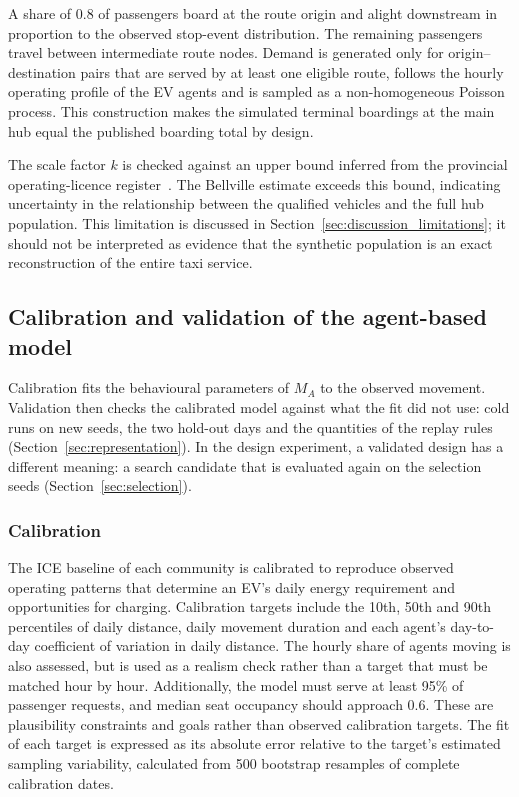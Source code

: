\documentclass{elsarticle}
\newcommand{\MA}{\ensuremath{M_A}}
\begin{document}
A share of 0.8 of passengers board at the route origin and alight downstream in proportion to the observed stop-event distribution. The remaining passengers travel between intermediate route nodes. Demand is generated only for origin--destination pairs that are served by at least one eligible route, follows the hourly operating profile of the EV agents and is sampled as a non-homogeneous Poisson process. This construction makes the simulated terminal boardings at the main hub equal the published boarding total by design.

The scale factor \(k\) is checked against an upper bound inferred from the provincial operating-licence register~\cite{wcpp2022_transport_public_works}. The Bellville estimate exceeds this bound, indicating uncertainty in the relationship between the qualified vehicles and the full hub population. This limitation is discussed in Section~\ref{sec:discussion_limitations}; it should not be interpreted as evidence that the synthetic population is an exact reconstruction of the entire taxi service.

\subsection{Calibration and validation of the agent-based model}
\label{sec:calibration}

Calibration fits the behavioural parameters of \(\MA\) to the observed movement. Validation then checks the calibrated model against what the fit did not use: cold runs on new seeds, the two hold-out days and the quantities of the replay rules (Section~\ref{sec:representation}). In the design experiment, a validated design has a different meaning: a search candidate that is evaluated again on the selection seeds (Section~\ref{sec:selection}).

\subsubsection{Calibration}

The ICE baseline of each community is calibrated to reproduce observed operating patterns that determine an EV's daily energy requirement and opportunities for charging. Calibration targets include the 10th, 50th and 90th percentiles of daily distance, daily movement duration and each agent's day-to-day coefficient of variation in daily distance. The hourly share of agents moving is also assessed, but is used as a realism check rather than a target that must be matched hour by hour. Additionally, the model must serve at least 95\% of passenger requests, and median seat occupancy should approach 0.6. These are plausibility constraints and goals rather than observed calibration targets. The fit of each target is expressed as its absolute error relative to the target's estimated sampling variability, calculated from 500 bootstrap resamples of complete calibration dates.
\end{document}
